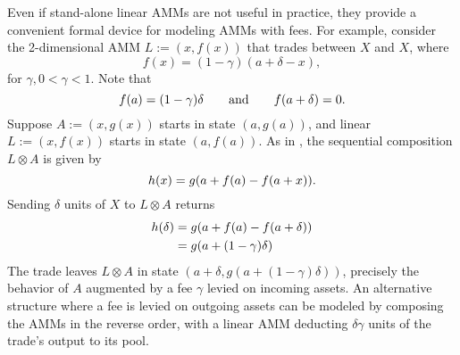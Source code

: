 Even if stand-alone linear AMMs are not useful in practice,
they provide a convenient formal device for modeling AMMs with fees.
For example,
consider the 2-dimensional AMM $L := (x,f(x))$ that trades between $X$ and $X$,
where
\begin{equation*}
f(x) = (1-\gamma)(a + \delta - x),  
\end{equation*}
for $\gamma, 0 < \gamma < 1$.
Note that
\begin{equation}
\eqnlabel{fee-f}
f(a) = (1-\gamma) \delta \qquad \text{and} \qquad f(a+\delta) = 0. 
\end{equation}
Suppose $A:=(x,g(x))$ starts in state $(a,g(a))$,
and linear $L:=(x,f(x))$ starts in state $(a,f(a))$.
As in ,
the sequential composition $L \otimes A$ is given by
\begin{equation}
\eqnlabel{fee-h}
h(x) = g(a + f(a) - f(a+x)).
\end{equation}
Sending $\delta$ units of $X$ to $L \otimes A$ returns
\begin{align*}
\eqnlabel{fee-delta}
  h(\delta)
  &= g(a + f(a) - f(a + \delta))\\
  &= g(a + (1-\gamma) \delta)
\end{align*}
The trade leaves $L \otimes A$ in state $(a + \delta, g(a + (1-\gamma)\delta))$,
precisely the behavior of $A$ augmented by a fee $\gamma$ levied on incoming assets.
An alternative structure where a fee is levied on outgoing assets
can be modeled by composing the AMMs in the reverse order,
with a linear AMM deducting $\delta \gamma$ units of the trade's output to its pool.

